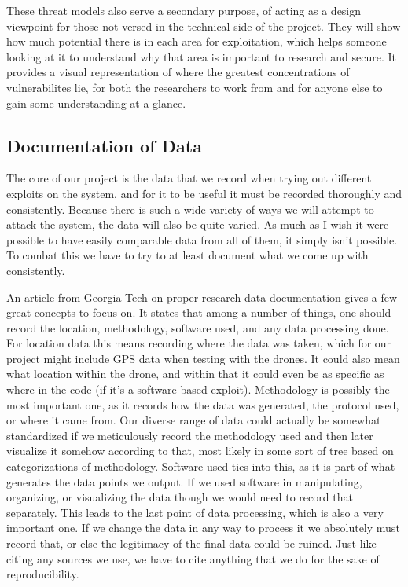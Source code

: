 \documentclass[IEEEtran,letterpaper,10pt,notitlepage,draftclsnofoot,onecolumn]{article}
\begin{document}
These threat models also serve a secondary purpose, of acting as a design viewpoint for those not versed in the technical side of the project.
They will show how much potential there is in each area for exploitation, which helps someone looking at it to understand why that area is important to research and secure.
It provides a visual representation of where the greatest concentrations of vulnerabilites lie, for both the researchers to work from and for anyone else to gain some understanding at a glance.

\subsection{Documentation of Data}
The core of our project is the data that we record when trying out different exploits on the system, and for it to be useful it must be recorded thoroughly and consistently. 
Because there is such a wide variety of ways we will attempt to attack the system, the data will also be quite varied. 
As much as I wish it were possible to have easily comparable data from all of them, it simply isn't possible. 
To combat this we have to try to at least document what we come up with consistently.

An article from Georgia Tech on proper research data documentation gives a few great concepts to focus on. \cite{GTDD}
It states that among a number of things, one should record the location, methodology, software used, and any data processing done. 
For location data this means recording where the data was taken, which for our project might include GPS data when testing with the drones. 
It could also mean what location within the drone, and within that it could even be as specific as where in the code (if it's a software based exploit).
Methodology is possibly the most important one, as it records how the data was generated, the protocol used, or where it came from.
Our diverse range of data could actually be somewhat standardized if we meticulously record the methodology used and then later visualize it somehow according to that, most likely in some sort of tree based on categorizations of methodology. 
Software used ties into this, as it is part of what generates the data points we output. 
If we used software in manipulating, organizing, or visualizing the data though we would need to record that separately. 
This leads to the last point of data processing, which is also a very important one.
If we change the data in any way to process it we absolutely must record that, or else the legitimacy of the final data could be ruined.
Just like citing any sources we use, we have to cite anything that we do for the sake of reproducibility.
\end{document}
